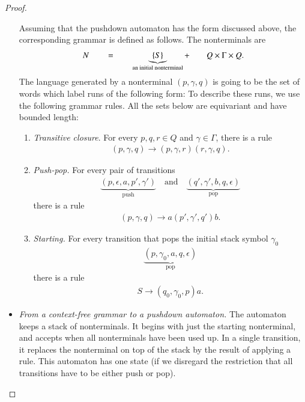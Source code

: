\begin{proof}
\begin{itemize}
		Assuming that the pushdown automaton has the form discussed above, the corresponding grammar is defined as follows. The nonterminals   are 
	  \begin{align*}
		   N \qquad  =  \qquad \underbrace{\{S\}}_{\text{an initial nonterminal}} + \qquad  Q \times \Gamma \times Q.
	  \end{align*}
	The language generated by a nonterminal $(p,\gamma,q)$ is going to be the set of words which label runs of the following form:
		To describe these runs, we use the following grammar rules. All  the sets  below are equivariant and have bounded length: 
	 \begin{enumerate}
		 \item \emph{Transitive closure}. For every  $p,q,r \in Q$ and $\gamma \in \Gamma$, there is a rule
		 \begin{align*}
			 (p,\gamma,q) \to (p,\gamma,r)(r,\gamma,q).
		 \end{align*}
		 \item \emph{Push-pop.} For every pair of transitions
		 \begin{align*}
			 \underbrace{(p,\epsilon, a, p', \gamma')}_{\text{push}} \quad \text{and} \quad 
			  \underbrace{(q',\gamma', b, q, \epsilon)}_{\text{pop}}
		 \end{align*}
		 there is  a rule
		 \begin{align*}
			 (p,\gamma,q) \to a (p',\gamma',q') b.
		 \end{align*}
		 \item \emph{Starting.}  For every transition that pops the initial stack symbol $\gamma_0$
		   \begin{align*}
			\underbrace{(p,\gamma_0, a, q, \epsilon)}_{\text{pop}}
		\end{align*} there is a rule 
		 \begin{align*}
			 S \to (q_0,\gamma_0,p) a .
		 \end{align*}
	 \end{enumerate} 
	  	\item  \emph{From a context-free grammar to a pushdown automaton.}  The automaton keeps a stack of nonterminals. It begins with just the starting nonterminal, and accepts when all nonterminals have been used up. In a single transition, it replaces the nonterminal on top of the stack by the result of applying a rule. This automaton has one state (if we disregard the restriction that all transitions have to be either push or pop). 

\end{itemize}
\end{proof}
